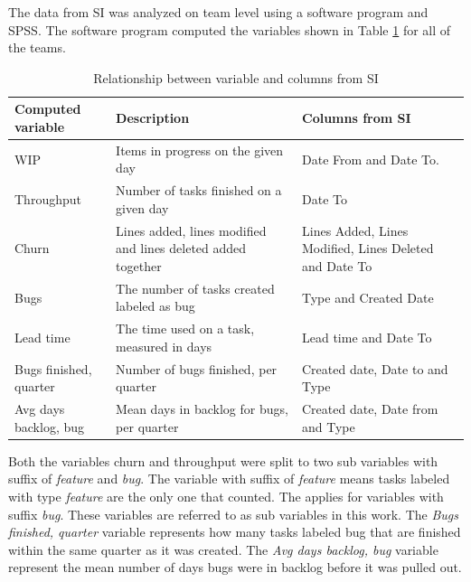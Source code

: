 \documentclass[UKenglish]{ifimaster}  %
\begin{document}
The data from SI was analyzed on team level using a software program and SPSS. The software program computed the variables shown in Table \ref{des} for all of the teams.
\newpage
\begin{table}[htbp]
\begin{center}
\caption{Relationship between variable and columns from SI}
    \begin{tabular}{| l | p{5cm} |  p{5cm} |}
    \hline
    \bf{Computed variable} &	\bf{Description}	 & \bf{Columns from SI}\\ \hline 
     WIP & \parbox[t]{5cm}{Items in progress on the given day} & Date From and Date To. \\ \hline
     Throughput	& Number of tasks finished on a given day & Date To \\ \hline
     Churn & Lines added, lines modified and lines deleted added together & Lines Added, Lines Modified, Lines Deleted and Date To \\ \hline
    Bugs & The number of tasks created labeled as bug & Type and Created Date \\ \hline
    Lead time & The time used on a task, measured in days & Lead time and Date To \\ \hline
    Bugs finished, quarter & Number of bugs finished, per quarter &Created date, Date to and Type \\ \hline
    Avg days backlog, bug & Mean days in backlog for bugs, per quarter & Created date, Date from and Type \\ \hline
  \end{tabular}
\label{des} %
\end{center}
\end{table}

 
Both the variables churn and throughput were split to two sub variables with suffix of \textit{feature} and \textit{bug}. The variable with suffix of \textit{feature} means tasks labeled with type \textit{feature} are the only one that counted. The applies for variables with suffix \textit{bug}. These variables are referred to as sub variables in this work.  The \textit{Bugs finished, quarter} variable represents how many tasks labeled bug that are finished within the same quarter as it was created.  The \textit{Avg days backlog, bug} variable represent the mean number of days bugs were in backlog before it was pulled out. %
\end{document}
